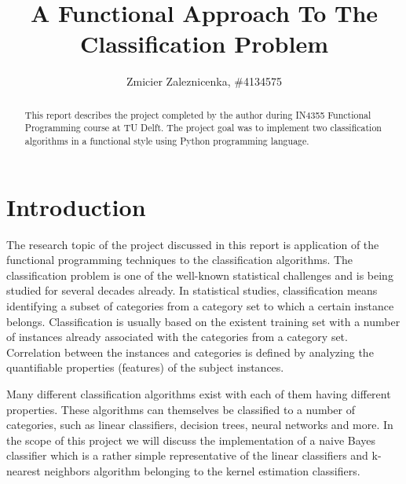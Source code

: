 \documentclass{llncs}
\begin{document}
\title{A Functional Approach To The Classification Problem}
\author{Zmicier Zaleznicenka, \#4134575}

\maketitle


\begin{abstract}
This report describes the project completed by the author during IN4355 Functional Programming course at TU Delft. The project goal was to implement two classification algorithms in a functional style using Python programming language.
\end{abstract}

\section{Introduction}

The research topic of the project discussed in this report is application of the functional programming techniques to the classification algorithms. The classification problem is one of the well-known statistical challenges and is being studied for several decades already. In statistical studies, classification means identifying a subset of categories from a category set to which a certain instance belongs. Classification is usually based on the existent training set with a number of instances already associated with the categories from a category set. Correlation between the instances and categories is defined by analyzing the quantifiable properties (features) of the subject instances\cite{WikiStatClass}.

Many different classification algorithms exist with each of them having different properties. These algorithms can themselves be classified to a number of categories, such as linear classifiers, decision trees, neural networks and more. In the scope of this project we will discuss the implementation of a naive Bayes classifier which is a rather simple representative of the linear classifiers and k-nearest neighbors algorithm belonging to the kernel estimation classifiers.
\end{document}
